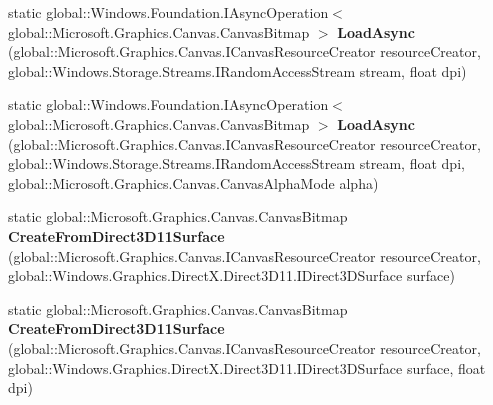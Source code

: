 \begin{DoxyCompactItemize}
\item 
\mbox{\label{class_microsoft_1_1_graphics_1_1_canvas_1_1_canvas_bitmap_ad38ec735e08607b9ecf7bbd6f1a7d229}} 
static global\+::\+Windows.\+Foundation.\+I\+Async\+Operation$<$ global\+::\+Microsoft.\+Graphics.\+Canvas.\+Canvas\+Bitmap $>$ {\bfseries Load\+Async} (global\+::\+Microsoft.\+Graphics.\+Canvas.\+I\+Canvas\+Resource\+Creator resource\+Creator, global\+::\+Windows.\+Storage.\+Streams.\+I\+Random\+Access\+Stream stream, float dpi)
\item 
\mbox{\label{class_microsoft_1_1_graphics_1_1_canvas_1_1_canvas_bitmap_a3f15d77e2e8485e54d0e45d2f972764d}} 
static global\+::\+Windows.\+Foundation.\+I\+Async\+Operation$<$ global\+::\+Microsoft.\+Graphics.\+Canvas.\+Canvas\+Bitmap $>$ {\bfseries Load\+Async} (global\+::\+Microsoft.\+Graphics.\+Canvas.\+I\+Canvas\+Resource\+Creator resource\+Creator, global\+::\+Windows.\+Storage.\+Streams.\+I\+Random\+Access\+Stream stream, float dpi, global\+::\+Microsoft.\+Graphics.\+Canvas.\+Canvas\+Alpha\+Mode alpha)
\item 
\mbox{\label{class_microsoft_1_1_graphics_1_1_canvas_1_1_canvas_bitmap_adb53e7172552d09bc317b5b85c254fff}} 
static global\+::\+Microsoft.\+Graphics.\+Canvas.\+Canvas\+Bitmap {\bfseries Create\+From\+Direct3\+D11\+Surface} (global\+::\+Microsoft.\+Graphics.\+Canvas.\+I\+Canvas\+Resource\+Creator resource\+Creator, global\+::\+Windows.\+Graphics.\+Direct\+X.\+Direct3\+D11.\+I\+Direct3\+D\+Surface surface)
\item 
\mbox{\label{class_microsoft_1_1_graphics_1_1_canvas_1_1_canvas_bitmap_a9bcb0865c8ef9a544991db05907b06ff}} 
static global\+::\+Microsoft.\+Graphics.\+Canvas.\+Canvas\+Bitmap {\bfseries Create\+From\+Direct3\+D11\+Surface} (global\+::\+Microsoft.\+Graphics.\+Canvas.\+I\+Canvas\+Resource\+Creator resource\+Creator, global\+::\+Windows.\+Graphics.\+Direct\+X.\+Direct3\+D11.\+I\+Direct3\+D\+Surface surface, float dpi)
\item 
\mbox{\label{class_microsoft_1_1_graphics_1_1_canvas_1_1_canvas_bitmap_af8889f744c558157dc904b1fd37e99a4}} 

\end{DoxyCompactItemize}
